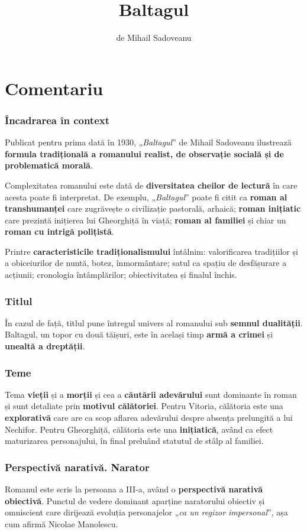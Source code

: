 \documentclass{article}
\title{Baltagul}
\author{de Mihail Sadoveanu}
\date{}
\newcommand{\qu}[1]{„\emph{#1}”}
\begin{document}
\maketitle

\part*{Comentariu}
\section{Încadrarea în context}
Publicat pentru prima dată în 1930, \qu{Baltagul} de Mihail Sadoveanu ilustrează \textbf{formula tradițională a romanului realist, de observație socială și de problematică morală}.

Complexitatea romanului este dată de \textbf{diversitatea cheilor de lectură} în care acesta poate fi interpretat. De exemplu, \qu{Baltagul} poate fi citit ca \textbf{roman al transhumanței} care zugrăvește o civilizație pastorală, arhaică; \textbf{roman inițiatic} care prezintă inițierea lui Gheorghiță în viață; \textbf{roman al familiei} și chiar un \textbf{roman cu intrigă polițistă}.

Printre \textbf{caracteristicile tradiționalismului} întâlnim: valorificarea tradițiilor și a obiceiurilor de nuntă, botez, înmormântare; satul ca spațiu de desfășurare a acțiunii; cronologia întâmplărilor; obiectivitatea și finalul închis.
\section{Titlul}
În cazul de față, titlul pune întregul univers al romanului sub \textbf{semnul dualității}. Baltagul, un topor cu două tăișuri, este în același timp \textbf{armă a crimei} și \textbf{unealtă a dreptății}.
\section{Teme}
Tema \textbf{vieții} și a \textbf{morții} și cea a \textbf{căutării adevărului} sunt dominante în roman și sunt detaliate prin \textbf{motivul călătoriei}. Pentru Vitoria, călătoria este una \textbf{explorativă} care are ca scop aflarea adevărului despre absența prelungită a lui Nechifor. Pentru Gheorghiță, călătoria este una \textbf{inițiatică}, având ca efect maturizarea personajului, în final preluând statutul de stâlp al familiei.
\section{Perspectivă narativă. Narator}
Romanul este scris la persoana a III-a, având o \textbf{perspectivă narativă obiectivă}. Punctul de vedere dominant aparține naratorului obiectiv și omniscient care dirijează evoluția personajelor \qu{ca un regizor impersonal}, așa cum afirmă Nicolae Manolescu.
\end{document}
